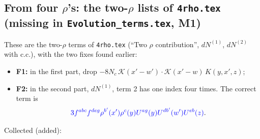 \documentclass[10pt]{article}
\numberwithin{equation}{section}
\newcommand{\new}[1]{{\color{blue}#1}}
\newcommand{\old}[1]{{\color{red}#1}}
\begin{document}
\subsection{From four $\rho$'s: the two-$\rho$ lists of \texttt{4rho.tex} (missing in \texttt{Evolution\_terms.tex}, M1)}
These are the two-$\rho$ terms of \texttt{4rho.tex} (``Two $\rho$ contribution'', $dN^{(1)}$, $dN^{(2)}$ with c.c.), with the two fixes found earlier:
\begin{itemize}
\item \textbf{F1:} in the first part, drop \old{$-8N_c\,\mathcal K(x'-w')\cdot\mathcal K(x'-w)\,K(y,x',z)$};
\item \textbf{F2:} in the second part, $dN^{(1)}$, term 2 has one index four times. The correct term is
\begin{equation*}\new{3f^{abc}f^{deg}\rho^{b'}(x')\rho^c(y)U^{ag}(y)U^{db'}(w')U^{eb}(z)}.\end{equation*}
\end{itemize}
Collected (\new{added}):
\end{document}
